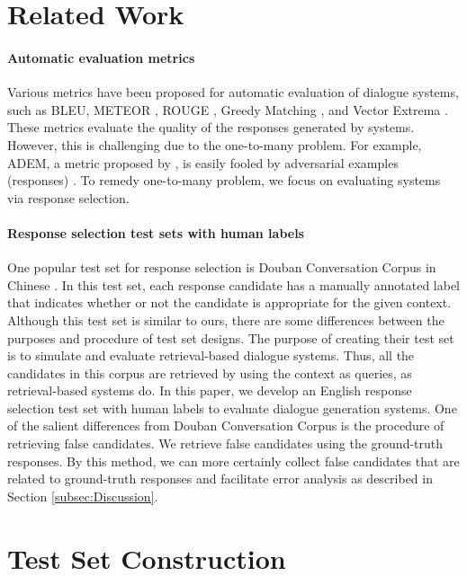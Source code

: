 \documentclass[11pt,a4paper]{article}
\begin{document}
%

\section{Related Work}

\paragraph{Automatic evaluation metrics}
Various metrics have been proposed for automatic evaluation of dialogue systems, such as BLEU, METEOR \cite{banerjee-lavie-2005-meteor}, ROUGE \cite{lin-2004-rouge},  Greedy Matching \cite{rus-lintean-2012-comparison}, and Vector Extrema \cite{forgues2014bootstrapping}.
These metrics evaluate the quality of the responses generated by systems.
However, this is challenging due to the one-to-many problem.
For example, ADEM, a metric proposed by \cite{lowe-etal-2017-towards}, is easily fooled by adversarial examples (responses) \cite{Sai2019ReevaluatingAA}.
To remedy one-to-many problem, we focus on evaluating systems via response selection.

\paragraph{Response selection test sets with human labels}
One popular test set for response selection is Douban Conversation Corpus in Chinese \cite{wu-etal-2017-sequential}.
In this test set, each response candidate has a manually annotated label that indicates whether or not the candidate is appropriate for the given context.
Although this test set is similar to ours, there are some differences between the purposes and procedure of test set designs.
The purpose of creating their test set is to simulate and evaluate retrieval-based dialogue systems.
Thus, all the candidates in this corpus are retrieved by using the context as queries, as retrieval-based systems do.
In this paper, we develop an English response selection test set with human labels to evaluate dialogue generation systems.
One of the salient differences from Douban Conversation Corpus is the procedure of retrieving false candidates.
We retrieve false candidates using the ground-truth responses.
%
By this method, we can more certainly collect false candidates that are related to ground-truth responses and facilitate error analysis as described in Section \ref{subsec:Discussion}.

%

\section{Test Set Construction}\label{sec:TestsetConstruction}
\end{document}
